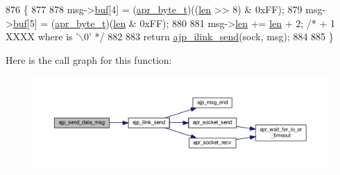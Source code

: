 \begin{DoxyCode}
876 \{
877 
878     msg->\hyperlink{structajp__msg_a7343b1803e9177dccb3c4716a5e12c3a}{buf}[4] = (\hyperlink{group__apr__platform_gadcfa334915b4605a0052cb4ca542eb3a}{apr\_byte\_t})((\hyperlink{group__APACHE__CORE__LOG_gab5a43233d60ef05c5b5bf5cba3d74468}{len} >> 8) & 0xFF);
879     msg->\hyperlink{structajp__msg_a7343b1803e9177dccb3c4716a5e12c3a}{buf}[5] = (\hyperlink{group__apr__platform_gadcfa334915b4605a0052cb4ca542eb3a}{apr\_byte\_t})(\hyperlink{group__APACHE__CORE__LOG_gab5a43233d60ef05c5b5bf5cba3d74468}{len} & 0xFF);
880 
881     msg->\hyperlink{structajp__msg_ab31fbddb808b5f3c0549cdb0f39639cf}{len} += \hyperlink{group__APACHE__CORE__LOG_gab5a43233d60ef05c5b5bf5cba3d74468}{len} + 2; \textcolor{comment}{/* + 1 XXXX where is '\(\backslash\)0' */}
882 
883     \textcolor{keywordflow}{return} \hyperlink{group__AJP__api_gae3b577e976125797a58790e35021a965}{ajp\_ilink\_send}(sock, msg);
884 
885 \}
\end{DoxyCode}


Here is the call graph for this function\+:
\nopagebreak
\begin{figure}[H]
\begin{center}
\leavevmode
\includegraphics[width=350pt]{group__AJP__api_gab7a17b5fc8605725ae72dd30497f7e59_cgraph}
\end{center}
\end{figure}


